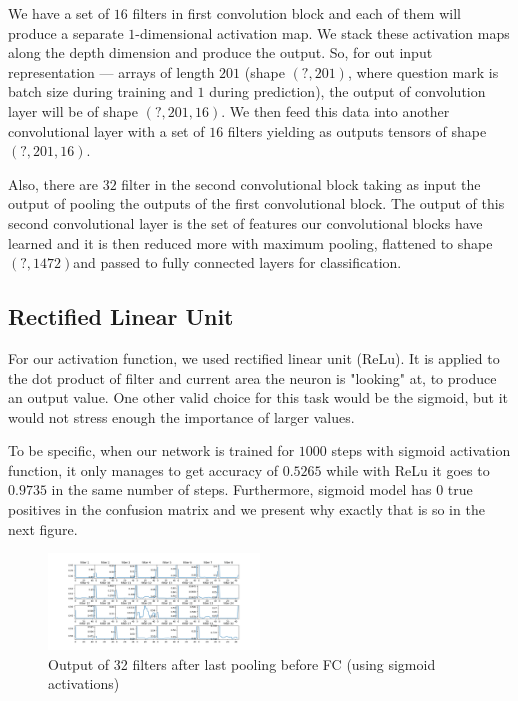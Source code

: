 \documentclass[twoside]{article}
\begin{document}
\begin{multicols}{2}
We have a set of $16$ filters in first convolution block and each of them will produce a separate $1$-dimensional activation map. We stack these activation maps along the depth dimension and produce the output. So, for out input representation --- arrays of length $201$ (shape $(?,201)$, where question mark is batch size during training and $1$ during prediction), the output of convolution layer will be of shape $(?,201,16)$. We then feed this data into another convolutional layer with a set of $16$ filters yielding as outputs tensors of shape $(?,201,16)$.

Also, there are $32$ filter in the second convolutional block taking as input the output of pooling the outputs of the first convolutional block. The output of this second convolutional layer is the set of features our convolutional blocks have learned and it is then reduced more with maximum pooling, flattened to shape $(?,1472) $and passed to fully connected layers for classification.

\subsection{Rectified Linear Unit}
For our activation function, we used rectified linear unit (ReLu). It is applied to the dot product of filter and current area the neuron is "looking" at, to produce an output value. One other valid choice for this task would be the sigmoid, but it would not stress enough the importance of larger values.

To be specific, when our network is trained for $1000$ steps with sigmoid activation function, it only manages to get accuracy of $0.5265$ while with ReLu it goes to $0.9735$ in the same number of steps. Furthermore, sigmoid model has $0$ true positives in the confusion matrix and we present why exactly that is so in the next figure.
\begin{figure}[H]
\includegraphics[width=0.5\textwidth]{sigmoid_pooling2}
\caption{Output of 32 filters after last pooling before FC (using sigmoid activations)}
\label{fig:sigmoid-pool2}
\end{figure}


\end{multicols}
\end{document}
